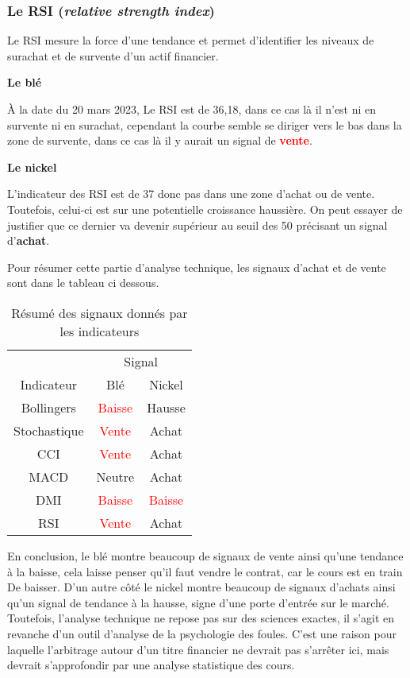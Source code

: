 \subsubsection*{Le RSI (\textit{relative strength index})}
Le RSI mesure la force d'une tendance et permet d'identifier les niveaux de surachat et de survente d'un actif financier.
\begin{multicols}{2}
\centerline{\textbf{Le blé}}
À la date du 20 mars 2023, Le RSI est de 36,18, dans ce cas là il n'est ni en survente ni en surachat, cependant la courbe semble se diriger vers le bas dans la zone de 
survente, dans ce cas là il y aurait un signal de \textcolor{red}{\textbf{vente}}.

\columnbreak
\centerline{\textbf{Le nickel}}
L'indicateur des RSI est de 37 donc pas dans une zone d'achat ou de vente. Toutefois, celui-ci est sur une potentielle croissance haussière. On peut essayer de justifier 
que ce dernier va devenir supérieur au seuil des 50 précisant un signal d'\textcolor{OliveGreen}{\textbf{achat}}. 
\end{multicols}

Pour résumer cette partie d'analyse technique, les signaux d'achat et de vente sont dans le tableau ci dessous.
\begin{table}[H]
    \centering
    \caption{Résumé des signaux donnés par les indicateurs}
    \sffamily
    \begin{tabular}{ccc}
    \toprule
                    & \multicolumn{2}{c}{Signal} \\
    Indicateur     & Blé                        & Nickel \\
    \cmidrule(r){1-1}\cmidrule(lr){2-3}
    Bollingers      & \textcolor{red}{Baisse}    & \textcolor{OliveGreen}{Hausse}\\
    Stochastique    & \textcolor{red}{Vente}     & \textcolor{OliveGreen}{Achat} \\
    CCI             & \textcolor{red}{Vente}     & \textcolor{OliveGreen}{Achat} \\
    MACD            & Neutre                     & \textcolor{OliveGreen}{Achat} \\
    DMI             & \textcolor{red}{Baisse}    & \textcolor{red}{Baisse}                   \\
    RSI             & \textcolor{red}{Vente}     & \textcolor{OliveGreen}{Achat} \\
    \bottomrule
    \end{tabular}
\end{table}

En conclusion, le blé montre beaucoup de signaux de vente ainsi qu'une tendance à la baisse, cela laisse penser qu'il faut vendre le contrat, car le cours est en train De
baisser. D'un autre côté le nickel montre beaucoup de signaux d'achats ainsi qu'un signal de tendance à la hausse, signe d'une porte d'entrée sur le marché.\\[11pt]
Toutefois, l'analyse technique ne repose pas sur des sciences exactes, il s'agit en revanche d'un outil d'analyse de la psychologie des foules. C'est une raison pour 
laquelle l'arbitrage autour d'un titre financier ne devrait pas s'arrêter ici, mais devrait s'approfondir par une analyse statistique des cours.